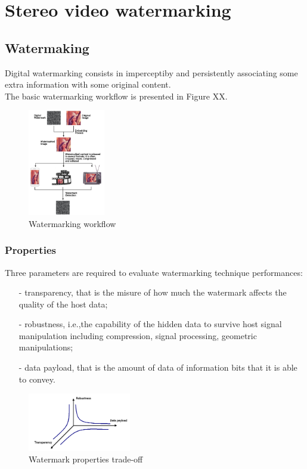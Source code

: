 \chapter{Stereo video watermarking}
\label{wat}

\section{Watermaking}

Digital watermarking consists in imperceptiby and persistently associating some extra information with some original content. \\
The basic watermarking workflow is presented in Figure XX.\\
\begin{figure}[h!]
\centering
\includegraphics[width=0.3\textwidth]{./img/wat_workflow.png}
\caption{\small{Watermarking workflow}}
\label{fig:workflow}
\end{figure}
\newpage
\subsection{Properties}
Three parameters are required to evaluate watermarking technique performances:
\begin{itemize}
\item[-] transparency, that is the misure of how much the watermark affects the quality of the host data;
\item[-] robustness, i.e.,the capability of the hidden data to survive host signal manipulation including compression, signal processing, geometric manipulations;
\item[-] data payload, that is the amount of data of information bits that it is able to convey.
\end{itemize}
\begin{figure}[h!]
\centering
\includegraphics[width=0.4\textwidth]{./img/properties.png}
\caption{\small{Watermark properties trade-off}}
\label{fig:properties}
\end{figure}


